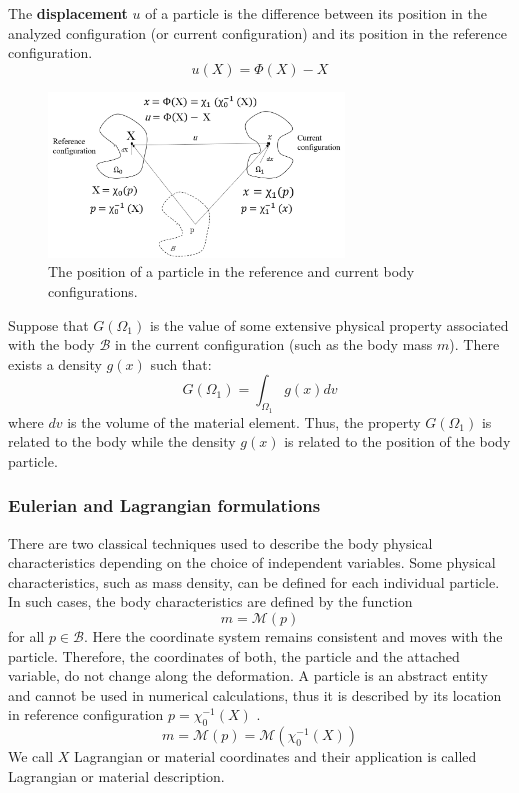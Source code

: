  The \textbf{displacement} $u$ of a particle is the difference between its position in the analyzed configuration (or current configuration) and its position in the reference configuration.
 \begin{equation}
 u(X) = \Phi(X) - X
 \end{equation}


\begin{figure}
\begin{center}
\includegraphics[width=0.7\textwidth,keepaspectratio]{figures/referenceFig.png} 
\caption{ The position of a particle in the reference and current body configurations.}
\label{reference_config_theory}
\end{center}
\end{figure}

Suppose that $G(\Omega_1)$ is the value of some extensive physical property  associated with the body $\mathcal{B}$ in the current configuration (such as the body mass $m$). There exists a density $g(x)$ such that:
 $$G(\Omega_1) = \int_{\Omega_1} g(x)dv$$  
 where $dv$ is the volume of the material element.
 Thus, the property $G(\Omega_1)$ is related to the body while the density $g(x)$ is related to the position of the body particle.
\subsubsection*{Eulerian and Lagrangian formulations}
There are two classical techniques used to describe the body physical characteristics depending on the choice of independent variables.
 Some physical characteristics, such as mass density, can be defined for each individual particle. In such cases, the body characteristics are defined by the function $$m =  \mathcal{M}(p)$$ for all $p \in \mathcal{B}$. Here the coordinate system remains consistent and moves with the particle. Therefore, the coordinates of both, the particle and the attached variable, do not change along the deformation. A particle is an abstract entity and cannot be used in numerical calculations, thus it is described by its location in reference configuration $p= \chi_0^{-1}(X)$ .
 $$m =  \mathcal{M}(p) = \mathcal{M}(\chi_0^{-1}(X))$$
 We call $X$ Lagrangian or material coordinates and their application is called Lagrangian or material description.  
 


